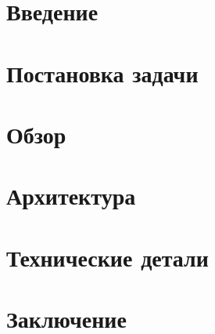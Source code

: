 
\usepackage{newfloat,caption,float}
\usepackage{newfloat}
\usepackage{subcaption}

\captionsetup[example]{labelfont=bf}


\captionsetup[subexample]{labelformat=simple}

\newcommand{\ReasonML}{\textsc{ReasonML}}
\newcommand{\OCaml}{\textsc{OCaml}}
\newcommand{\ocamllex}{\textsc{ocamllex}}
\newcommand{\ocamlyacc}{\textsc{ocamlyacc}}
\newcommand{\merlin}{\textsc{merlin}}

\ifx\pdfoutput\undefined
\usepackage{graphicx}
\else
\usepackage[pdftex]{graphicx}
\fi
\usepackage{float}
\usepackage{caption}
\usepackage{subcaption}




\maketitle
\setcounter{tocdepth}{2}
\tableofcontents

\section{Введение}


\section{Постановка задачи}
\label{sec:task}


\section{Обзор}


\section{Архитектура}


\section{Технические детали}


\section{Заключение}



\setmonofont[Mapping=tex-text]{CMU Typewriter Text}



